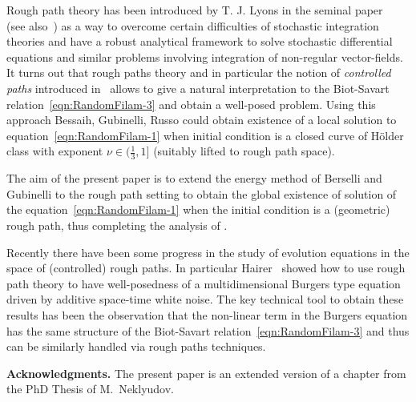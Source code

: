 \documentclass[11pt,a4paper,leqno]{amsart}%
\theoremstyle{plain}
\theoremstyle{remark}
\theoremstyle{plain}
\numberwithin{equation}{section}
\begin{document}
Rough path theory has been introduced by T. J. Lyons in the seminal paper~\cite{[Lyons-1998]} (see also~\cites{[LyonsQian-2002],[LionsStFlour],[FrizVictoir]}) as a way to overcome certain difficulties of stochastic integration theories and have a robust analytical framework to solve stochastic differential equations and similar problems involving integration of non-regular vector-fields.
It turns out that rough paths theory and in particular the notion of \emph{controlled paths} introduced in~\cite{[Gubinelli-2004]} allows to give a natural interpretation to the Biot-Savart relation~\eqref{eqn:RandomFilam-3} and obtain a well-posed problem. Using this approach  Bessaih, Gubinelli, Russo \cite{[Bess+Gub_2005]} could obtain existence of a local solution to  equation~\eqref{eqn:RandomFilam-1} when initial condition is a closed curve of
H\"{o}lder class with exponent $\nu\in (\frac{1}{3},1]$ (suitably lifted to rough path space).

The aim of the present paper is to extend the energy method of Berselli and Gubinelli to the rough path setting to obtain  the global existence of solution of the equation~\eqref{eqn:RandomFilam-1}  when the initial condition is a (geometric) rough path, thus completing the analysis of \cite{[Bess+Gub_2005]}.

Recently there have been some progress in the study of evolution equations in the space of (controlled) rough paths. In particular Hairer~\cite{Hairer} showed how to use rough path theory to have well-posedness of a multidimensional Burgers type equation driven by additive space-time white noise. The key technical tool to obtain these results has been the observation that the non-linear term in the Burgers equation has the same structure of the Biot-Savart relation~\eqref{eqn:RandomFilam-3} and thus can be similarly handled via rough paths techniques.


\textbf{Acknowledgments.} The present paper is an extended version of a chapter from the PhD Thesis of M.~Neklyudov.

\vfill\newpage
\end{document}

